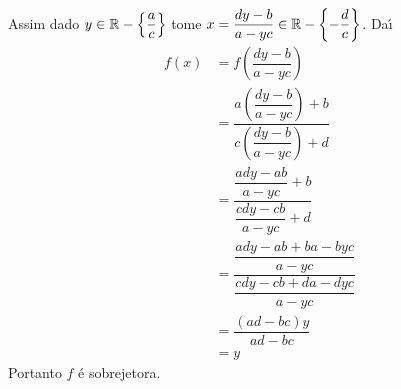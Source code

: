 \documentclass[12pt]{exam}
\begin{document}
Assim dado $y \in  \mathbb{R} - \left\{\dfrac{a}{c}\right\}$ tome $x = \dfrac{dy - b}{a - yc} \in \mathbb{R} - \left\{-\dfrac{d}{c}\right\}$. Da{\'\i}
\begin{align*}
	f(x) &= f\left(\dfrac{dy - b}{a - yc}\right) \\
	&= \dfrac{a\left(\dfrac{dy - b}{a - yc}\right) + b}{c\left(\dfrac{dy - b}{a - yc}\right) + d} \\
	&= \dfrac{\dfrac{ady - ab}{a - yc} + b}{\dfrac{cdy - cb}{a - yc} + d} \\
	&= \dfrac{\dfrac{ady - ab + ba - byc}{a - yc}}{\dfrac{cdy - cb + da - dyc}{a - yc}} \\
	&= \dfrac{(ad - bc)y}{ad - bc} \\ 
	&= y
\end{align*}
Portanto $f$ \'e sobrejetora.
\end{document}

